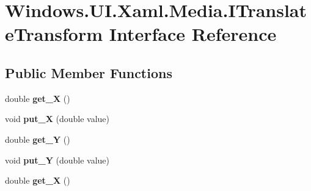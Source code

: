 \hypertarget{interface_windows_1_1_u_i_1_1_xaml_1_1_media_1_1_i_translate_transform}{}\section{Windows.\+U\+I.\+Xaml.\+Media.\+I\+Translate\+Transform Interface Reference}
\label{interface_windows_1_1_u_i_1_1_xaml_1_1_media_1_1_i_translate_transform}
\subsection*{Public Member Functions}
\begin{DoxyCompactItemize}
\item 
\mbox{\label{interface_windows_1_1_u_i_1_1_xaml_1_1_media_1_1_i_translate_transform_ad50558830dd38b2c9737f34ed46d2fb5}} 
double {\bfseries get\+\_\+X} ()
\item 
\mbox{\label{interface_windows_1_1_u_i_1_1_xaml_1_1_media_1_1_i_translate_transform_a100906e975e93817a3fc61f890a7198d}} 
void {\bfseries put\+\_\+X} (double value)
\item 
\mbox{\label{interface_windows_1_1_u_i_1_1_xaml_1_1_media_1_1_i_translate_transform_abe5ed0af613e25734413e2c0dec03333}} 
double {\bfseries get\+\_\+Y} ()
\item 
\mbox{\label{interface_windows_1_1_u_i_1_1_xaml_1_1_media_1_1_i_translate_transform_a180ffc4b24774d39be33f54f787239be}} 
void {\bfseries put\+\_\+Y} (double value)
\item 
\mbox{\label{interface_windows_1_1_u_i_1_1_xaml_1_1_media_1_1_i_translate_transform_ad50558830dd38b2c9737f34ed46d2fb5}} 
double {\bfseries get\+\_\+X} ()
\item 
\mbox{\label{interface_windows_1_1_u_i_1_1_xaml_1_1_media_1_1_i_translate_transform_a100906e975e93817a3fc61f890a7198d}} 

\end{DoxyCompactItemize}
